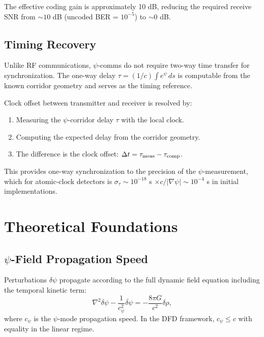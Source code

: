 \documentclass[twocolumn,superscriptaddress,prd,nofootinbib]{revtex4-2}
\begin{document}
The effective coding gain is approximately 10 dB, reducing the required
receive SNR from $\sim 10$ dB (uncoded BER = $10^{-5}$) to $\sim 0$ dB.

\subsection{Timing Recovery}

Unlike RF communications, $\psi$-comms do not require two-way time
transfer for synchronization.
The one-way delay $\tau = (1/c)\int e^\psi\,ds$ is computable from the
known corridor geometry and serves as the timing reference.

Clock offset between transmitter and receiver is resolved by:
\begin{enumerate}
\item Measuring the $\psi$-corridor delay $\tau$ with the local clock.
\item Computing the expected delay from the corridor geometry.
\item The difference is the clock offset: $\Delta t = \tau_{\rm meas}
- \tau_{\rm comp}$.
\end{enumerate}

This provides one-way synchronization to the precision of the
$\psi$-measurement, which for atomic-clock detectors is
$\sigma_\tau \sim 10^{-18}$ s $\times c / |\nabla\psi| \sim
10^{-4}$ s in initial implementations.

\section{Theoretical Foundations}\label{sec:theory}

\subsection{$\psi$-Field Propagation Speed}

Perturbations $\delta\psi$ propagate according to the full dynamic
field equation including the temporal kinetic term:
\begin{equation}
\nabla^2\delta\psi - \frac{1}{c_\psi^2}\ddot{\delta\psi} =
-\frac{8\pi G}{c^2}\delta\rho,
\label{eq:wave-eq}
\end{equation}
where $c_\psi$ is the $\psi$-mode propagation speed.
In the DFD framework, $c_\psi \leq c$ with equality in the linear
regime.
\end{document}
